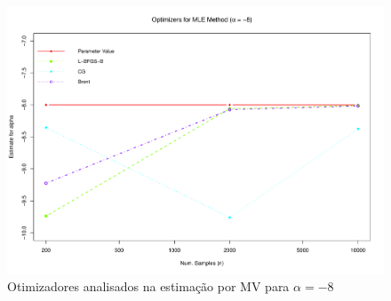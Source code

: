 \documentclass[12pt]{article}
\begin{document}
\begin{figure}[H]
     \centering
     \includegraphics[scale=0.5]{plots/OptimsAlpha-8.pdf}
     \caption{Otimizadores analisados na estimação por MV para $\alpha = -8$}
     \label{graf_4}
\end{figure}

\end{document}
